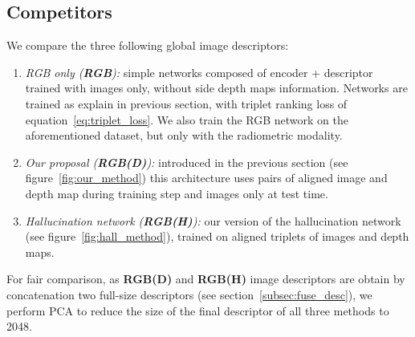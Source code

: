 \subsection{Competitors}
\label{subsec:competitors}
We compare the three following global image descriptors:
\begin{enumerate}
    \item \textit{RGB only (\textbf{RGB}):} simple networks composed of encoder + descriptor trained with images only, without side depth maps information. Networks are trained as explain in previous section, with triplet ranking loss of equation~\ref{eq:triplet_loss}. We also train the RGB network on the aforementioned dataset, but only with the radiometric modality.
    \item \textit{Our proposal (\textbf{RGB(D)}):} introduced in the previous section (see figure~\ref{fig:our_method}) this architecture uses pairs of aligned image and depth map during training step and images only at test time.
	\item \textit{Hallucination network (\textbf{RGB(H)}):} our version of the hallucination network~\cite{Hoffman2016} (see figure~\ref{fig:hall_method}), trained on aligned triplets of images and depth maps.
\end{enumerate}

\noindent For fair comparison, as \textbf{RGB(D)} and \textbf{RGB(H)} image descriptors are obtain by concatenation two full-size descriptors (see section~\ref{subsec:fuse_desc}), we perform PCA to reduce the size of the final descriptor of all three methods to 2048.